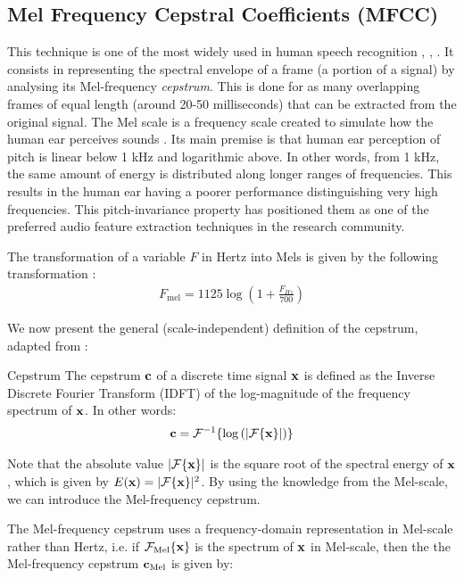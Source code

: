 \documentclass[../main.tex]{subfiles} \label{chapter_soa}
\begin{document}
\subsection{Mel Frequency Cepstral Coefficients (MFCC)} \label{subsection_mfcc}
\par This technique is one of the most widely used in human speech recognition \cite{Jurafsky2009}, \cite{Chou2008a}, \cite{Stowell2014}. It consists in representing the spectral envelope of a frame (a portion of a signal) by analysing its Mel-frequency \emph{cepstrum}. This is done for as many overlapping frames of equal length (around 20-50 milliseconds) that can be extracted from the original signal. The Mel scale is a frequency scale created to simulate how the human ear perceives sounds \cite{Sludge2000}. Its main premise is that human ear perception of pitch is linear below 1 kHz and logarithmic above. In other words, from 1 kHz, the same amount of energy is distributed along longer ranges of frequencies. This results in the human ear having a poorer performance distinguishing very high frequencies. This pitch-invariance property has positioned them as one of the preferred audio feature extraction techniques in the research community.
\par The transformation of a variable $F$ in Hertz into Mels is given by the following transformation \cite{Lyons2014}:
\begin{align*}
F_{\text{mel}} = 1125 \log{\left(1 + \frac{F_{Hz}}{700}\right)}
\end{align*}
\par We now present the general (scale-independent) definition of the cepstrum, adapted from \cite{Gutierrez-Osuna2009}:
\begin{definition}{Cepstrum} \label{def_cepstrum}
The cepstrum $\mathbf{c}$ of a discrete time signal $\mathbf{x}$ is defined as the Inverse Discrete Fourier Transform (IDFT) of the log-magnitude of the frequency spectrum of $\mathbf{x}$. In other words:
\begin{align*}
\mathbf{c} = \mathcal{F}^{-1}\{\log{(\lvert\mathcal{F}\{\mathbf{x}\}\rvert)}\}
\end{align*}
\end{definition}
\par Note that the absolute value $\lvert\mathcal{F}\{\mathbf{x}\}\rvert$ is the square root of the spectral energy of $\mathbf{x}$, which is given by $E(\mathbf{x}) = \lvert\mathcal{F}\{\mathbf{x}\}\rvert^2$. By using the knowledge from the Mel-scale, we can introduce the Mel-frequency cepstrum. 
\par The Mel-frequency cepstrum uses a frequency-domain representation in Mel-scale rather than Hertz, i.e. if $\mathcal{F_{\text{Mel}}\{\mathbf{x}\}}$ is the spectrum of $\mathbf{x}$ in Mel-scale, then the the Mel-frequency cepstrum $\mathbf{c}_{\text{Mel}}$ is given by:
\end{document}
